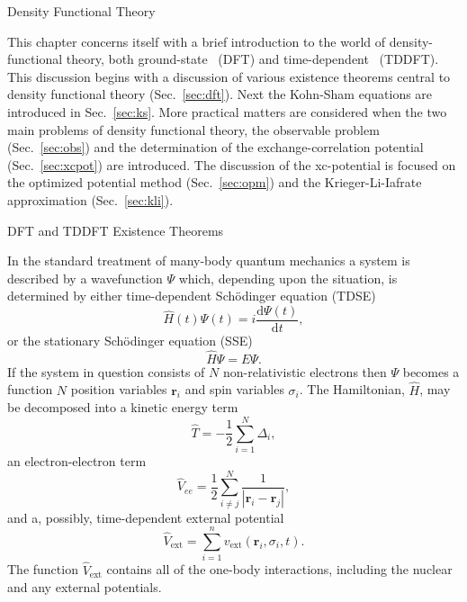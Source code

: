 \documentclass[letterpaper, 11 pt]{report}
\begin{document}
\begin{chapter}{Density Functional Theory \label{chap:dft}}

   This chapter concerns itself with a brief introduction to the world of density-functional theory,
   both ground-state~\cite{dft-engel} (DFT) and time-dependent~\cite{tddft, marques-1} (TDDFT). This
   discussion begins with a discussion of various existence theorems central to density functional
   theory (Sec.~\ref{sec:dft}). Next the Kohn-Sham equations are introduced in Sec.~\ref{sec:ks}.
   More practical matters are considered when the two main problems of density functional theory,
   the observable problem (Sec.~\ref{sec:obs}) and the determination of the exchange-correlation
   potential (Sec.~\ref{sec:xcpot}) are introduced. The discussion of the xc-potential is focused on
   the optimized potential method (Sec.~\ref{sec:opm}) and the Krieger-Li-Iafrate approximation
   (Sec.~\ref{sec:kli}).

   \begin{section}{DFT and TDDFT Existence Theorems \label{sec:dft}}

      In the standard treatment of many-body quantum mechanics a system is described by a wavefunction
      $\Psi$ which, depending upon the situation, is determined by either time-dependent Sch\"{o}dinger
      equation (TDSE)
      \begin{equation} \label{eq:tdse}
         \hat{H}(t) \Psi(t) = i \frac{\mathrm{d} \Psi(t)}{\mathrm{d} t},
      \end{equation}
      or the stationary Sch\"{o}dinger equation (SSE)
      \begin{equation} \label{eq:sse}
         \hat{H} \Psi = E \Psi.
      \end{equation}
      If the system in question consists of $N$ non-relativistic electrons then $\Psi$ becomes a
      function $N$ position variables $\mathbf{r}_i$ and spin variables $\sigma_i$. The Hamiltonian,
      $\hat{H}$, may be decomposed into a kinetic energy term
      \begin{equation} \label{eq:Top} %
         \hat{T} = -\frac{1}{2} \sum\limits^{N}_{i=1} \Delta_i,
      \end{equation}
      an electron-electron term
      \begin{equation} \label{eq:Vee} %
         \hat{V}_{ee} = \frac{1}{2} \sum\limits^{N}_{i \neq j}
                        \frac{1}{\left| \mathbf{r}_i - \mathbf{r}_j \right|},
      \end{equation}
      and a, possibly, time-dependent external potential
      \begin{equation} \label{eq:Vext}
         \hat{V}_\mathrm{ext} = \sum\limits^{n}_{i = 1} v_\mathrm{ext} (\mathbf{r}_i, \sigma_i, t).
      \end{equation}
      The function $\hat{V}_\mathrm{ext}$ contains all of the one-body interactions, including the
      nuclear and any external potentials.


\end{section}
\end{chapter}
\end{document}
